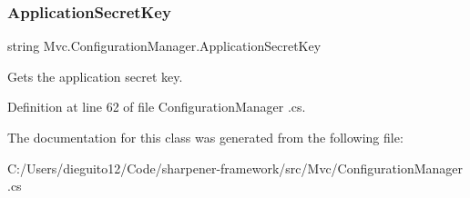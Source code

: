 \subsubsection{\texorpdfstring{Application\+Secret\+Key}{ApplicationSecretKey}}
{\footnotesize\ttfamily string Mvc.\+Configuration\+Manager.\+Application\+Secret\+Key\hspace{0.3cm}{\ttfamily [get]}}



Gets the application secret key. 



Definition at line 62 of file Configuration\+Manager .\+cs.



The documentation for this class was generated from the following file\+:\begin{DoxyCompactItemize}
\item 
C\+:/\+Users/dieguito12/\+Code/sharpener-\/framework/src/\+Mvc/Configuration\+Manager .\+cs\end{DoxyCompactItemize}
